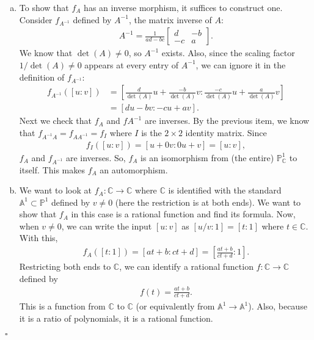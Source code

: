 \documentclass[12pt]{article}
\newcommand{\A}{\mathbb{A}}
\newcommand{\C}{\mathbb{C}}
\newcommand{\f}[2]{\frac{#1}{#2}}
\begin{document}
\begin{enumerate}[(a)]
	\item To show that $f_A$ has an inverse morphism, it suffices to construct one. Consider $f_{A^{-1}}$ defined by $A^{-1}$, the matrix inverse of $A$:
	\begin{align*}
	A^{-1} = 
	\f{1}{ad-bc}\begin{bmatrix}
	d & -b \\ -c & a
	\end{bmatrix}.
	\end{align*}
	We know that $\det(A) \neq 0$, so $A^{-1}$ exists. Also, since the scaling factor $1/\det(A) \neq 0$ appears at every entry of $A^{-1}$, we can ignore it in the definition of $f_{A^{-1}}$:
	\begin{align*}
	f_{A^{-1}}([u:v]) &= \left[\f{d}{\det(A)}u + \f{-b}{\det(A)}v : \f{-c}{\det(A)}u + \f{a}{\det(A)}v \right] \\
	&= [du-bv : -cu+av].
	\end{align*}
	Next we check that $f_{A}$ and $f{A^{-1}}$ are inverses. By the previous item, we know that $f_{A^{-1}A} = f_{AA^{-1}} = f_{I}$ where $I$ is the $2\times 2$ identity matrix. Since 
	\begin{align*}
	f_I([u:v]) = [u + 0v : 0u+v] = [u:v],
	\end{align*} 
	$f_{A}$ and $f_{A^{-1}}$ are inverses. So, $f_{A}$ is an isomorphism from (the entire) $\mathbb{P}^1_{\mathbb{C}}$ to itself. This makes $f_A$ an automorphism. 
	
	
	
	\item We want to look at $f_A : \C \to \C$ where $\mathbb{C}$ is identified with the standard $\A^1 \subset \mathbb{P}^1$ defined by $v\neq 0$ (here the restriction is at both ends). We want to show that $f_A$ in this case is a rational function and find its formula. Now, when $v\neq 0$, we can write the input $[u:v]$ as $[u/v:1] = [t:1]$ where $t\in \mathbb{C}$. With this, 
	\begin{align*}
	f_A([t:1]) = [at+b : ct+d] = \left[\f{at+b}{ct+d} : 1\right].
	\end{align*} 	 
	Restricting both ends to $\C$, we can identify a rational function $f: \mathbb{C} \to \mathbb{C}$ defined by
	\begin{align*}
	f(t) = \f{at+b}{ct+d}.
	\end{align*}
	This is a function from $\C$ to $\C$ (or equivalently from $\A^1 \to \A^1$). Also, because it is a ratio of polynomials, it is a rational function. 
\end{enumerate}
\hfill $\square$
\end{document}
